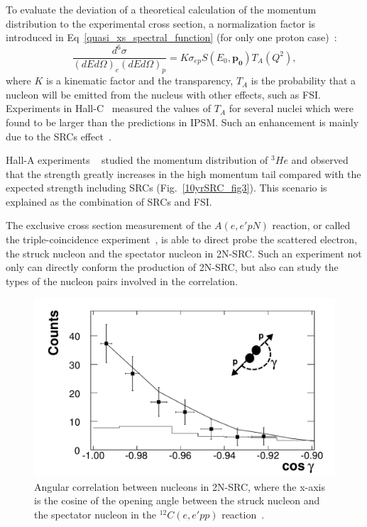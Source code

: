 To evaluate the deviation of a theoretical calculation of the momentum distribution to the experimental cross section, a normalization factor is introduced in Eq~\eqref{quasi_xs_spectral_function} (for only one proton case)~\cite{Higinbotham:2009hi}:
\begin{equation}
  \frac{d^{6}\sigma}{(dEd\Omega)_{e}(dEd\Omega)_{p}} = K\sigma_{ep}S(E_{0},\mathbf{p_{0}})T_{A}(Q^{2}),
\end{equation}
where $K$ is a kinematic factor and the transparency, $T_{A}$ is the probability that a nucleon will be emitted from the nucleus with other effects, such as FSI. Experiments in Hall-C~\cite{PhysRevLett.80.5072,PhysRevC.66.044613,PhysRevC.72.054602} measured the values of $T_{A}$ for several nuclei which were found to be larger than the predictions in IPSM. Such an enhancement is mainly due to the SRCs effect~\cite{Higinbotham:2009hi}. 

Hall-A experiments ~\cite{PhysRevLett.94.082305,PhysRevLett.94.192302} studied the momentum distribution of $^{3}He$ and observed that the strength greatly increases in the high momentum tail compared with the expected strength including SRCs (Fig.~\ref{10yrSRC_fig3}). This scenario is explained as the combination of SRCs and FSI. 

The exclusive cross section measurement of the $A(e,e'pN)$ reaction, or called the triple-coincidence experiment~\cite{PhysRevLett.90.042301,PhysRevLett.99.072501,src_since}, is able to direct probe the scattered electron, the struck nucleon and the spectator nucleon in 2N-SRC. Such an experiment not only can directly conform the production of 2N-SRC, but also can study the types of the nucleon pairs involved in the correlation.  
\begin{figure}[!ht]
  \begin{center}
    \includegraphics[type=pdf,ext=.pdf,read=.pdf,width=0.60\linewidth]{./figures/physics/10yrSRC_fig5}
    \caption[Angular correlation between nucleons in 2N-SRC]{\footnotesize{Angular correlation between nucleons in 2N-SRC, where the x-axis is the cosine of the opening angle between the struck nucleon and the spectator nucleon in the $^{12}C(e,e'pp)$ reaction~\cite{PhysRevLett.99.072501}.}}
    \label{triple_src_cos}
  \end{center}
\end{figure} 

